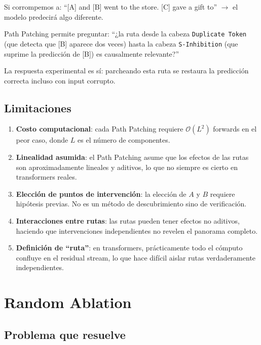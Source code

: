 \documentclass[11pt,a4paper]{report}
\theoremstyle{definition}
\begin{document}
Si corrompemos a: ``[A] and [B] went to the store. [C] gave a gift to'' $\rightarrow$ el modelo predecirá algo diferente.

Path Patching permite preguntar: ``¿la ruta desde la cabeza \texttt{Duplicate Token} (que detecta que [B] aparece dos veces) hasta la cabeza \texttt{S-Inhibition} (que suprime la predicción de [B]) es causalmente relevante?''

La respuesta experimental es sí: parcheando esta ruta se restaura la predicción correcta incluso con input corrupto.

\section{Limitaciones}

\begin{enumerate}
    \item \textbf{Costo computacional}: cada Path Patching requiere $\mathcal{O}(L^2)$ forwards en el peor caso, donde $L$ es el número de componentes.
    \item \textbf{Linealidad asumida}: el Path Patching asume que los efectos de las rutas son aproximadamente lineales y aditivos, lo que no siempre es cierto en transformers reales.
    \item \textbf{Elección de puntos de intervención}: la elección de $A$ y $B$ requiere hipótesis previas. No es un método de descubrimiento sino de verificación.
    \item \textbf{Interacciones entre rutas}: las rutas pueden tener efectos no aditivos, haciendo que intervenciones independientes no revelen el panorama completo.
    \item \textbf{Definición de ``ruta''}: en transformers, prácticamente todo el cómputo confluye en el residual stream, lo que hace difícil aislar rutas verdaderamente independientes.
\end{enumerate}

\newpage

\chapter{Random Ablation}
\label{ch:random-ablation}

\section{Problema que resuelve}
\end{document}
